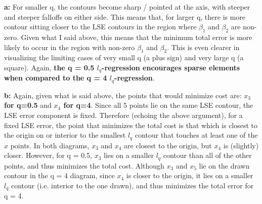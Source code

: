 \documentclass[12pt]{article}%
\begin{document}
\textbf{a:} For smaller q, the contours become sharp / pointed at the axis, with steeper and steeper falloffs on either side. This means that, for larger q, there is more contour sitting closer to the LSE contours in the region where $\beta_1$ and $\beta_2$ are non-zero. Given what I said above, this means that the minimum total error is more likely to occur in the region with non-zero $\beta_1$ and $\beta_2$. This is even clearer in visualizing the limiting cases of very small q (a plus sign) and very large q (a square). Again, \textbf{the q = 0.5 $l_q$-regression encourages sparse elements when compared to the q = 4 $l_q$-regression}.

\textbf{b:} Again, given what is said above, the points that would minimize cost are: \textbf{$x_3$ for q=0.5} and \textbf{$x_4$ for q=4}. Since all 5 points lie on the same LSE contour, the LSE error component is fixed. Therefore (echoing the above argument), for a fixed LSE error, the point that minimizes the total cost is that which is closest to the origin on or interior to the smallest $l_q$ contour that touches at least one of the $x$ points. In both diagrams, $x_3$ and $x_4$ are closest to the origin, but $x_4$ is (slightly) closer. However, for q = 0.5, $x_3$ lies on a smaller $l_q$ contour than all of the other points, and thus minimizes the total cost. Although $x_3$ and $x_5$ lie on the drawn contour in the q = 4 diagram, since $x_4$ is closer to the origin, it lies on a smaller $l_q$ contour (i.e. interior to the one drawn), and thus minimizes the total error for q = 4.
\end{document}

